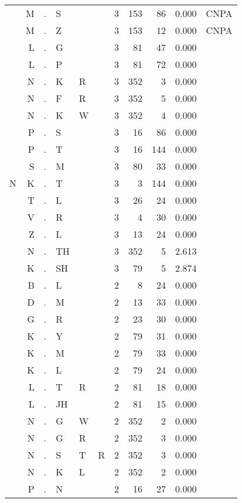 \begin{longtable}{r@{ } r@{ } c@{ } l@{ } l@{ } l@{ } r r r r l }
  & M & . & S &   &   & 3 & 153 & 86 & 0.000 & \textsc{CNPA} \\
  & M & . & Z &   &   & 3 & 153 & 12 & 0.000 & \textsc{CNPA} \\
  & L & . & G &   &   & 3 & 81 & 47 & 0.000 &  \\
  & L & . & P &   &   & 3 & 81 & 72 & 0.000 &  \\
  & N & . & K & R &   & 3 & 352 & 3 & 0.000 &  \\
  & N & . & F & R &   & 3 & 352 & 5 & 0.000 &  \\
  & N & . & K & W &   & 3 & 352 & 4 & 0.000 &  \\
  & P & . & S &   &   & 3 & 16 & 86 & 0.000 &  \\
  & P & . & T &   &   & 3 & 16 & 144 & 0.000 &  \\
  & S & . & M &   &   & 3 & 80 & 33 & 0.000 &  \\
N & K & . & T &   &   & 3 & 3 & 144 & 0.000 &  \\
  & T & . & L &   &   & 3 & 26 & 24 & 0.000 &  \\
  & V & . & R &   &   & 3 & 4 & 30 & 0.000 &  \\
  & Z & . & L &   &   & 3 & 13 & 24 & 0.000 &  \\
  & N & . & TH &   &   & 3 & 352 & 5 & 2.613 &  \\
  & K & . & SH &   &   & 3 & 79 & 5 & 2.874 &  \\
  & B & . & L &   &   & 2 & 8 & 24 & 0.000 &  \\
  & D & . & M &   &   & 2 & 13 & 33 & 0.000 &  \\
  & G & . & R &   &   & 2 & 23 & 30 & 0.000 &  \\
  & K & . & Y &   &   & 2 & 79 & 31 & 0.000 &  \\
  & K & . & M &   &   & 2 & 79 & 33 & 0.000 &  \\
  & K & . & L &   &   & 2 & 79 & 24 & 0.000 &  \\
  & L & . & T & R &   & 2 & 81 & 18 & 0.000 &  \\
  & L & . & JH &   &   & 2 & 81 & 15 & 0.000 &  \\
  & N & . & G & W &   & 2 & 352 & 2 & 0.000 &  \\
  & N & . & G & R &   & 2 & 352 & 3 & 0.000 &  \\
  & N & . & S & T & R & 2 & 352 & 3 & 0.000 &  \\
  & N & . & K & L &   & 2 & 352 & 2 & 0.000 &  \\
  & P & . & N &   &   & 2 & 16 & 27 & 0.000 &  \\

\end{longtable}

